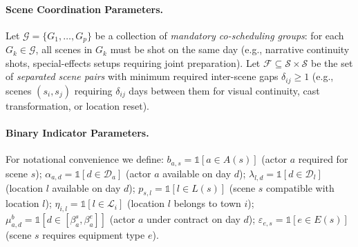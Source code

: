 \paragraph{Scene Coordination Parameters.}
Let $\mathcal{G} = \{G_1, \ldots, G_p\}$ be a collection of \emph{mandatory co-scheduling groups}: for each $G_k \in \mathcal{G}$, all scenes in $G_k$ must be shot on the same day (e.g., narrative continuity shots, special-effects setups requiring joint preparation).
Let $\mathcal{F} \subseteq \mathcal{S} \times \mathcal{S}$ be the set of \emph{separated scene pairs} with minimum required inter-scene gaps $\delta_{ij} \geq 1$ (e.g., scenes $(s_i, s_j)$ requiring $\delta_{ij}$ days between them for visual continuity, cast transformation, or location reset).

\paragraph{Binary Indicator Parameters.}
For notational convenience we define:
$b_{a,s} = \mathbb{1}[a \in A(s)]$ (actor $a$ required for scene $s$);
$\alpha_{a,d} = \mathbb{1}[d \in \mathcal{D}_a]$ (actor $a$ available on day $d$);
$\lambda_{l,d} = \mathbb{1}[d \in \mathcal{D}_l]$ (location $l$ available on day $d$);
$p_{s,l} = \mathbb{1}[l \in L(s)]$ (scene $s$ compatible with location $l$);
$\eta_{i,l} = \mathbb{1}[l \in \mathcal{L}_i]$ (location $l$ belongs to town $i$);
$\mu^b_{a,d} = \mathbb{1}[d \in [\beta^s_a, \beta^e_a]]$ (actor $a$ under contract on day $d$);
$\varepsilon_{e,s} = \mathbb{1}[e \in E(s)]$ (scene $s$ requires equipment type $e$).

